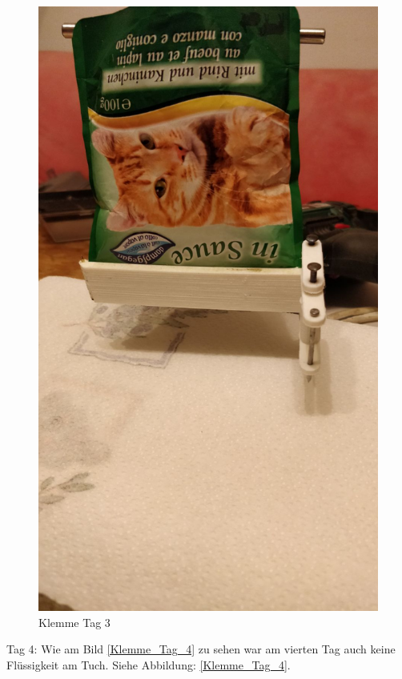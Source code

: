 \begin{figure}[H]
   \begin{minipage}[hbt]{.3\linewidth} %
      \includegraphics[width=\linewidth]{Bilder/Dichtheitsexperiment/Tag_3}
      \caption{Klemme Tag 3}
      \label{Klemme_Tag_3}
   \end{minipage}
\end{figure}

Tag 4: Wie am Bild \ref{Klemme_Tag_4} zu sehen war am vierten Tag auch keine Flüssigkeit am Tuch. Siehe Abbildung: \ref{Klemme_Tag_4}.\\ 

